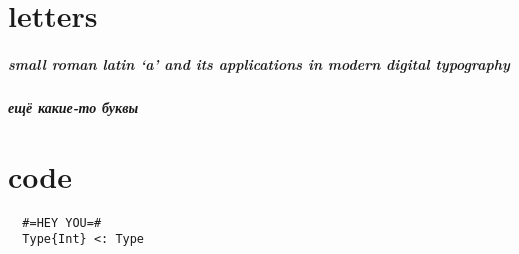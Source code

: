 \documentclass{trlnotes}
\begin{document}
\appendix
\chapter{letters}
\paragraph{small roman latin `a' and its appli\-cations in 
modern digital typography}
\paragraph{ещё какие-то буквы}


\chapter{\textsf{code}}
\begin{verbatim}
  #=HEY YOU=#
  Type{Int} <: Type
\end{verbatim}
\end{document}
